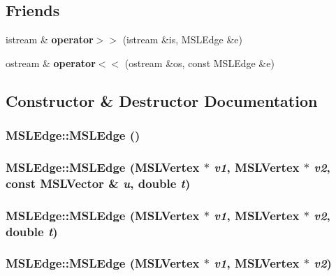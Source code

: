 \subsection*{Friends}
\begin{CompactItemize}
\item 
istream \& {\bf operator$>$$>$} (istream \&is, MSLEdge \&e)
\item 
ostream \& {\bf operator$<$$<$} (ostream \&os, const MSLEdge \&e)
\end{CompactItemize}


\subsection{Constructor \& Destructor Documentation}
\subsubsection{\setlength{\rightskip}{0pt plus 5cm}MSLEdge::MSLEdge ()}\label{classMSLEdge_a0}


\subsubsection{\setlength{\rightskip}{0pt plus 5cm}MSLEdge::MSLEdge ({\bf MSLVertex} $\ast$ {\em v1}, {\bf MSLVertex} $\ast$ {\em v2}, const {\bf MSLVector} \& {\em u}, double {\em t})}\label{classMSLEdge_a1}


\subsubsection{\setlength{\rightskip}{0pt plus 5cm}MSLEdge::MSLEdge ({\bf MSLVertex} $\ast$ {\em v1}, {\bf MSLVertex} $\ast$ {\em v2}, double {\em t})}\label{classMSLEdge_a2}


\subsubsection{\setlength{\rightskip}{0pt plus 5cm}MSLEdge::MSLEdge ({\bf MSLVertex} $\ast$ {\em v1}, {\bf MSLVertex} $\ast$ {\em v2})}\label{classMSLEdge_a3}


